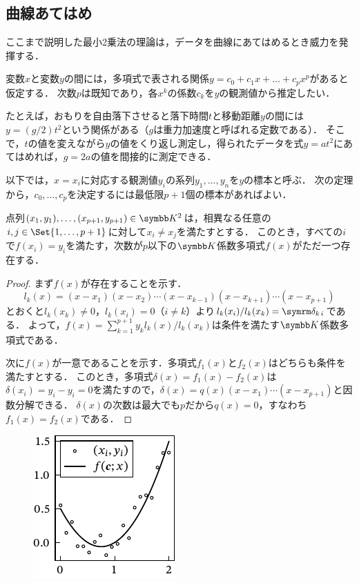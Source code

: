 \documentclass[../../main]{subfiles}
\begin{document}
\subsection{曲線あてはめ}

ここまで説明した最小2乗法の理論は，データを曲線にあてはめるとき威力を発揮する．

変数\(x\)と変数\(y\)の間には，多項式で表される関係\(y=c_0+c_1x+\dots+c_px^p\)があると仮定する．
次数\(p\)は既知であり，各\(x^k\)の係数\(c_k\)を\(y\)の観測値から推定したい．

たとえば，おもりを自由落下させると落下時間\(t\)と移動距離\(y\)の間には\(y=(g/2)t^2\)という関係がある（\(g\)は重力加速度と呼ばれる定数である）．
そこで，\(t\)の値を変えながら\(y\)の値をくり返し測定し，得られたデータを式\(y=at^2\)にあてはめれば，\(g=2a\)の値を間接的に測定できる．

以下では，\(x=x_i\)に対応する観測値\(y_i\)の系列\(y_1,\dots,y_n\)を\(y\)の標本と呼ぶ．
次の定理から，\(c_0,\dots,c_p\)を決定するには最低限\(p+1\)個の標本があればよい．

\begin{theorem}{}{}
  点列\((x_1,y_1),\dots,(x_{p+1},y_{p+1})\in\numset{K}^2\)は，相異なる任意の\(i,j\in\Set{1,\dots,p+1}\)に対して\(x_i\neq x_j\)を満たすとする．
  このとき，すべての\(i\)で\(f(x_i)=y_i\)を満たす，次数が\(p\)以下の\(\numset{K}\)係数多項式\(f(x)\)がただ一つ存在する\footnotemark ．
\end{theorem}

\begin{proof}
  まず\(f(x)\)が存在することを示す．
  \[
    l_k(x) = (x-x_1)(x-x_2)\dotsm(x-x_{k-1})(x-x_{k+1})\dotsm(x-x_{p+1})
  \]
  とおくと\(l_k(x_k)\neq 0\)，\(l_k(x_i)=0\)（\(i\neq k\)）より\(l_k(x_i)/l_k(x_k)=\kdelta{k}{i}\)である．
  よって，\(f(x)=\sum_{k=1}^{p+1}y_kl_k(x)/l_k(x_k)\)は条件を満たす\(\numset{K}\)係数多項式である．

  次に\(f(x)\)が一意であることを示す．多項式\(f_1(x)\)と\(f_2(x)\)はどちらも条件を満たすとする．
  このとき，多項式\(\delta(x)=f_1(x)-f_2(x)\)は\(\delta(x_i)=y_i-y_i=0\)を満たすので，\(\delta(x)=q(x)(x-x_1)\dotsm(x-x_{p+1})\)と因数分解できる．
  \(\delta(x)\)の次数は最大でも\(p\)だから\(q(x)=0\)，すなわち\(f_1(x)=f_2(x)\)である．
\end{proof}

\begin{figure}
  \includegraphics{figures/regression.pdf}
\end{figure}
\end{document}
